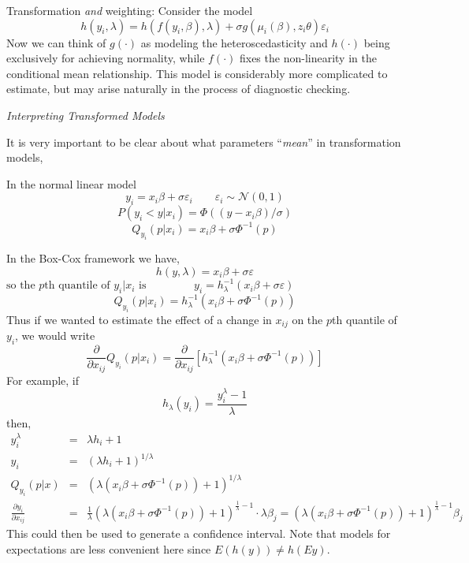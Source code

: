 \documentclass[11pt]{amsbook}
\begin{document}
\vspace{5mm}
\noindent Transformation {\em and} weighting:  Consider the model
$$
h(y_i, \lambda) = h(f(y_i, \beta), \lambda) + \sigma g(\mu_i(\beta), 
z_i \theta)\varepsilon_i
$$
Now we can think of $g(\cdot)$ as modeling the heteroscedasticity and 
$h(\cdot)$ being exclusively for achieving normality, while $f(\cdot) $ 
fixes the non-linearity in the conditional mean relationship.
This model is considerably more complicated to estimate, but may arise
naturally in the process of diagnostic checking.

\vspace{5mm}
\begin{center}
{\em Interpreting Transformed Models}
\end{center}

It is very important to be clear about what parameters ``{\em mean}'' in
transformation models, 

In the normal linear model
$$
y_i = x_i  \beta + \sigma \varepsilon_i \qquad \varepsilon_i \sim {\mathcal N}(0, 1)
$$
$$
P(y_i < y|x_i) = \Phi ((y-x_i\beta)/\sigma)
$$
$$
Q_{y_i}(p|x_i) = x_i\beta + \sigma\Phi^{-1}(p)
$$

%

In the Box-Cox framework we have,
$$
h(y, \lambda) = x_i\beta + \sigma\varepsilon
$$
$$
\mbox{so the $p$th quantile of $y_i|x_i$ is } \qquad \qquad  y_i = h_\lambda^{-1} (x_i\beta + \sigma\varepsilon)  \qquad\qquad \qquad \qquad\qquad \qquad \qquad \qquad 
$$
$$
Q_{y_i} (p|x_i) = h_\lambda^{-1} (x_i\beta + \sigma\Phi^{-1}(p))
$$
Thus if we wanted to estimate the effect of a change in $x_{ij}$ on 
the $p$th quantile of $y_i$, we would write
$$
\frac{\partial}{\partial x_{ij}} Q_{y_i} (p |x_i) = \frac{\partial}{\partial x_{ij}}
[h_\lambda^{-1} (x_i\beta + \sigma\Phi^{-1}(p))]
$$
For example, if 
$$
h_\lambda (y_i) = \frac{y_i^\lambda -1}{\lambda}
$$
then,
\begin{eqnarray*}
y_i^\lambda &=& \lambda h_i+1\\
y_i &=& (\lambda h_i+1)^{1/\lambda}\\
Q_{y_i} (p|x)&=& (\lambda(x_i\beta + \sigma\Phi^{-1} (p) ) +1)^{1/\lambda}\\
\frac{\partial y_i}{\partial x_{ij}} &=& \frac{1}{\lambda} (\lambda(x_i\beta + \sigma\Phi^{-1} (p) ) +1)^{\frac{1}{\lambda} - 1} \cdot \lambda \beta_j = 
(\lambda(x_i\beta + \sigma\Phi^{-1} (p) ) +1)^{\frac{1}{\lambda} - 1} \beta_j
\end{eqnarray*}
This could then be used to generate a confidence interval.
Note that models for expectations are less convenient here since 
$E(h(y)) \neq h(Ey)$.
\end{document}
